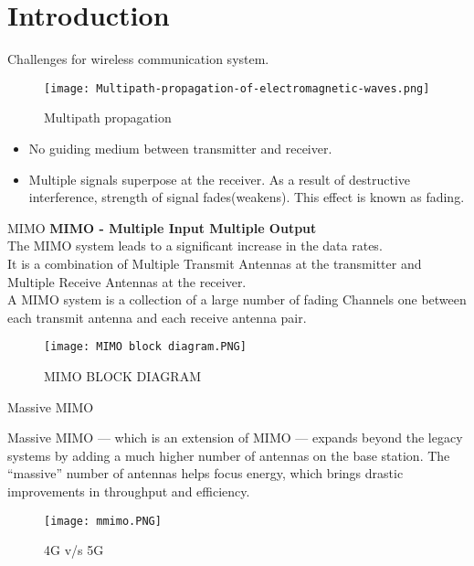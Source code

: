 \documentclass{beamer}
\begin{document}
\section{Introduction}
\begin{frame}{Challenges for wireless communication system.}
\begin{figure}
    \centering
    \texttt{[image: Multipath-propagation-of-electromagnetic-waves.png]}
    \caption{Multipath propagation}
    \label{fig:my_label}
\end{figure}

\begin{itemize}
\item No guiding medium between transmitter and receiver.\\
\item Multiple signals superpose at the receiver. As a result of destructive interference, strength of signal fades(weakens). This effect is known as fading.
\end{itemize}

\end{frame}
\begin{frame}{MIMO}
\textbf{MIMO - Multiple Input Multiple Output}\\
The MIMO system leads to a significant increase
in the data rates.\\
It is a
combination of Multiple Transmit Antennas at the transmitter and Multiple Receive Antennas at the receiver.\\
A MIMO system is a collection of a large number of fading Channels one between
each transmit antenna and each receive antenna pair. 

\begin{figure}
    \centering
    \texttt{[image: MIMO block diagram.PNG]}
    \caption{MIMO BLOCK DIAGRAM}
    \label{2}
\end{figure}
\end{frame}
\begin{frame}{Massive MIMO}

Massive MIMO — which is an extension of MIMO — expands beyond the legacy systems by adding a much higher number of antennas on the base station. The “massive” number of antennas helps focus energy, which brings drastic improvements in throughput and efficiency. 

\begin{figure}
    \centering
    \texttt{[image: mmimo.PNG]}
    \caption{4G v/s 5G}
    \label{3}
\end{figure}
\end{frame}
\end{document}
